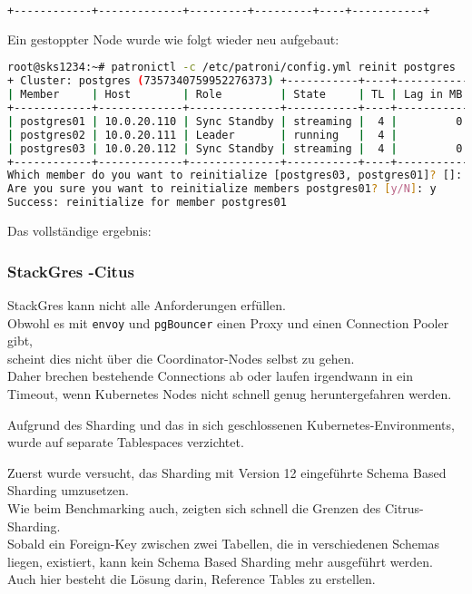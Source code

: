 \begin{flushleft}
\begin{lstlisting}[language=bash, caption=Patroni - Testing - Switchover,captionpos=b,label={lst:testing_patroni_switchover},breaklines=true]
+------------+-------------+---------+---------+----+-----------+
\end{lstlisting}
    Ein gestoppter Node wurde wie folgt wieder neu aufgebaut:
\lstset{style=gra_codestyle}
\begin{lstlisting}[language=bash, caption=Patroni - Testing - Reinit,captionpos=b,label={lst:testing_patroni_reinit},breaklines=true]
root@sks1234:~# patronictl -c /etc/patroni/config.yml reinit postgres
+ Cluster: postgres (7357340759952276373) +-----------+----+-----------+
| Member     | Host        | Role         | State     | TL | Lag in MB |
+------------+-------------+--------------+-----------+----+-----------+
| postgres01 | 10.0.20.110 | Sync Standby | streaming |  4 |         0 |
| postgres02 | 10.0.20.111 | Leader       | running   |  4 |           |
| postgres03 | 10.0.20.112 | Sync Standby | streaming |  4 |         0 |
+------------+-------------+--------------+-----------+----+-----------+
Which member do you want to reinitialize [postgres03, postgres01]? []: postgres01
Are you sure you want to reinitialize members postgres01? [y/N]: y
Success: reinitialize for member postgres01
\end{lstlisting}
    Das vollständige ergebnis:
    
\end{flushleft}
\begin{flushleft}
    \subsubsection{StackGres -Citus}
    StackGres kann nicht alle Anforderungen erfüllen.\\
    Obwohl es mit \texttt{envoy} und \texttt{pgBouncer} einen Proxy und einen Connection Pooler gibt,\\
    scheint dies nicht über die Coordinator-Nodes selbst zu gehen.\\
    Daher brechen bestehende Connections ab oder laufen irgendwann in ein Timeout, wenn \Gls{Kubernetes} Nodes nicht schnell genug heruntergefahren werden.
\end{flushleft}
\begin{flushleft}
    Aufgrund des Sharding und das in sich geschlossenen \Gls{Kubernetes}-Environments, wurde auf separate Tablespaces verzichtet.
\end{flushleft}
\begin{flushleft}
    Zuerst wurde versucht, das Sharding mit Version 12 eingeführte Schema Based Sharding umzusetzen.\\
    Wie beim Benchmarking auch, zeigten sich schnell die Grenzen des Citrus-Sharding.\\
    Sobald ein Foreign-Key zwischen zwei Tabellen, die in verschiedenen Schemas liegen, existiert, kann kein Schema Based Sharding mehr ausgeführt werden.\\
    Auch hier besteht die Lösung darin, Reference Tables zu erstellen.
\end{flushleft}
